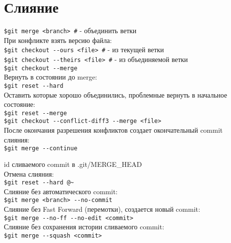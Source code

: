 \section{Слияние}

\noindent \texttt{\$git merge <branch> \indent\#} - объединить ветки \\

\noindent При конфликте взять версию файла: \\
\indent \texttt{\$git checkout {-}-ours <file> \indent\#} - из текущей ветки  \\
\indent \texttt{\$git checkout {-}-theirs <file> \indent\#} - из объединяемой ветки \\

\noindent \texttt{\$git checkout {-}-merge} \\

\noindent Вернуть в состоянии до merge: \\
\indent \texttt{\$git reset {-}-hard} \\
\noindent Оставить которые хорошо объединились, проблемные вернуть в начальное состояние: \\
\indent \texttt{\$git reset {-}-merge} \\

\noindent \texttt{\$git checkout {-}-conflict-diff3 {-}-merge <file>} \\

\noindent После окончания разрешения конфликтов создает окончательный commit слияния: \\
\indent \texttt{\$git merge {-}-continue}

\noindent id сливаемого commit в .git/MERGE\_HEAD \\

\noindent Отмена слияния: \\
\indent \texttt{\$git reset {-}-hard {@}\~} \\

\noindent Слияние без автоматического commit: \\
\indent \texttt{\$git merge <branch> {-}-no-commit} \\

\noindent Слияние без Fast Forward (перемотки), создается новый commit: \\
\indent \texttt{\$git merge {-}-no-ff {-}-no-edit <commit>} \\

\noindent Слияние без сохранения истории сливаемого commit: \\
\indent \texttt{\$git merge {-}-squash <commit>} \\